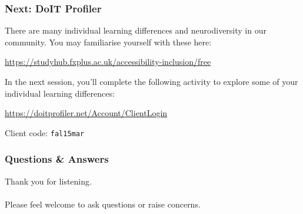 \begin{frame}
	\frametitle{Next: DoIT Profiler}
	
	There are many individual learning differences and neurodiversity in our community. You may familiarise yourself with these here:
	
	\vspace{1em}
	
	\url{https://studyhub.fxplus.ac.uk/accessibility-inclusion/free}
	
	\vspace{1em}
	
	In the next session, you'll complete the following activity to explore some of your individual learning differences:
	
	\vspace{2em}
	
	\url{https://doitprofiler.net/Account/ClientLogin}
	
	\vspace{2em}
	
	Client code: \texttt{fal15mar}

\end{frame}

\begin{frame}
	\frametitle{Questions \& Answers}	
	\begin{center}
		Thank you for listening. 
		\\~\\
		Please feel welcome to ask questions or raise concerns.
	\end{center}
\end{frame}



	
	
	
	
